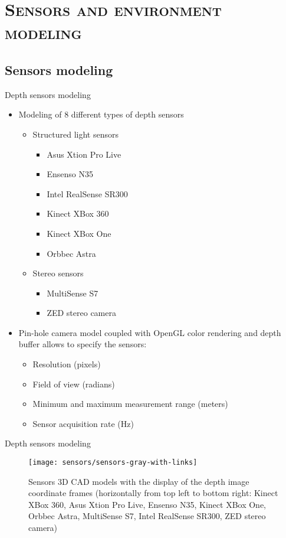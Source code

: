 \section{\scshape Sensors and environment modeling}
\subsection*{Sensors modeling}
\begin{frame}{Depth sensors modeling}
	\begin{itemize}
		\item Modeling of 8 different types of depth sensors
		\begin{itemize}
			\item Structured light sensors
			\begin{itemize}
				\item Asus Xtion Pro Live
				\item Ensenso N35
				\item Intel RealSense SR300
				\item Kinect XBox 360
				\item Kinect XBox One
				\item Orbbec Astra
			\end{itemize}
			\item Stereo sensors
			\begin{itemize}
				\item MultiSense S7
				\item ZED stereo camera
			\end{itemize}
		\end{itemize}
		\item Pin-hole camera model coupled with OpenGL color rendering and depth buffer allows to specify the sensors:
		\begin{itemize}
			\item Resolution (pixels)
			\item Field of view (radians)
			\item Minimum and maximum measurement range (meters)
			\item Sensor acquisition rate (Hz)
		\end{itemize}
	\end{itemize}
\end{frame}


\begin{frame}{Depth sensors modeling}
	\begin{figure}
		\centering
		\texttt{[image: sensors/sensors-gray-with-links]}
		\caption{Sensors 3D CAD models with the display of the depth image coordinate frames (horizontally from top left to bottom right: Kinect XBox 360, Asus Xtion Pro Live, Ensenso N35, Kinect XBox One, Orbbec Astra, MultiSense S7, Intel RealSense SR300, ZED stereo camera)}
	\end{figure}
\end{frame}


